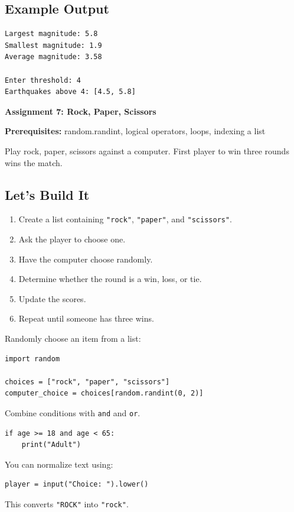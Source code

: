 \documentclass[11pt,letterpaper]{article}
\newcommand{\assignment}[3]{
    \clearpage
    {\Large\bfseries\color{navy} Assignment #1: #2}

    \vspace{2mm}
    {\small\color{darkgray}\textbf{Prerequisites:} #3}

    \vspace{3mm}
}
\newcommand{\steps}{\subsection*{Let's Build It}}
\newcommand{\exampleoutput}{\subsection*{Example Output}}
\begin{document}
\exampleoutput

\begin{lstlisting}[style=outputstyle]
Largest magnitude: 5.8
Smallest magnitude: 1.9
Average magnitude: 3.58

Enter threshold: 4
Earthquakes above 4: [4.5, 5.8]
\end{lstlisting}

\assignment{7}{Rock, Paper, Scissors}
{random.randint, logical operators, loops, indexing a list}

\begin{missionbox}
Play rock, paper, scissors against a computer. First player to win three rounds wins the match.
\end{missionbox}

\steps

\begin{enumerate}
    \item Create a list containing
    \texttt{"rock"}, \texttt{"paper"}, and
    \texttt{"scissors"}.
    \item Ask the player to choose one.
    \item Have the computer choose randomly.
    \item Determine whether the round is a win, loss, or tie.
    \item Update the scores.
    \item Repeat until someone has three wins.
\end{enumerate}

\begin{hintbox}
Randomly choose an item from a list:

\begin{lstlisting}
import random

choices = ["rock", "paper", "scissors"]
computer_choice = choices[random.randint(0, 2)]
\end{lstlisting}

Combine conditions with \texttt{and} and \texttt{or}.

\begin{lstlisting}
if age >= 18 and age < 65:
    print("Adult")
\end{lstlisting}

You can normalize text using:

\begin{lstlisting}
player = input("Choice: ").lower()
\end{lstlisting}

This converts \texttt{"ROCK"} into \texttt{"rock"}.
\end{hintbox}
\end{document}
